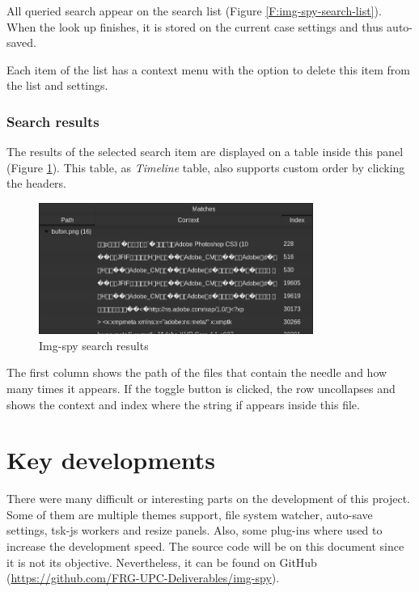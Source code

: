 All queried search appear on the search list (Figure
\ref{F:img-spy-search-list}). When the look up finishes, it is stored on the
current case settings and thus auto-saved.

Each item of the list has a context menu with the option to delete this item
from the list and settings.

\subsubsection{Search results}

The results of the selected search item are displayed on a table inside this
panel (Figure \ref{F:img-spy-search-results}). This table, as \textit{Timeline}
table, also supports custom order by clicking the headers.

\begin{figure}[htb]
	\begin{center}
		\includegraphics[width=0.8\textwidth]
		{./figures/search-results.png}
		\caption{Img-spy search results}
		\label{F:img-spy-search-results}
	\end{center}
\end{figure}

The first column shows the path of the files that contain the needle and 
how many times it appears. If the toggle button is clicked, the row
uncollapses and shows the context and index where the string if appears inside
this file.


\section{Key developments}

There were many difficult or interesting parts on the development of this 
project. Some of them are multiple themes support, file system watcher, 
auto-save settings, tsk-js workers and resize panels. Also, some plug-ins where
used to increase the development speed. The source code will be on this document
since it is not its objective. Nevertheless, it can be found on GitHub
(\url{https://github.com/FRG-UPC-Deliverables/img-spy}).



